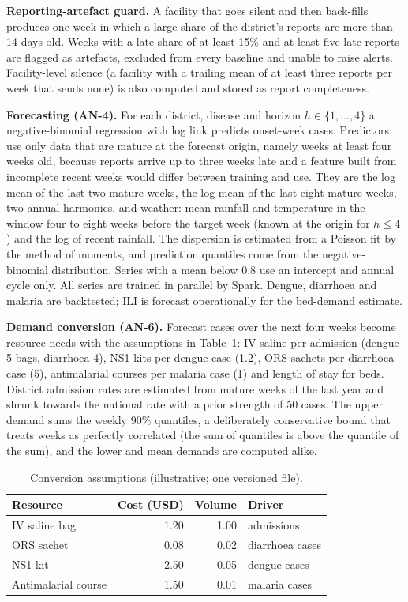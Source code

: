 \documentclass[conference]{IEEEtran}
\begin{document}
\textbf{Reporting-artefact guard.} A facility that goes silent and then back-fills produces one week in which a large share of the district's reports are more than 14 days old. Weeks with a late share of at least 15\% and at least five late reports are flagged as artefacts, excluded from every baseline and unable to raise alerts. Facility-level silence (a facility with a trailing mean of at least three reports per week that sends none) is also computed and stored as report completeness.

\textbf{Forecasting (AN-4).} For each district, disease and horizon $h\in\{1,\dots,4\}$ a negative-binomial regression with log link predicts onset-week cases. Predictors use only data that are mature at the forecast origin, namely weeks at least four weeks old, because reports arrive up to three weeks late and a feature built from incomplete recent weeks would differ between training and use. They are the log mean of the last two mature weeks, the log mean of the last eight mature weeks, two annual harmonics, and weather: mean rainfall and temperature in the window four to eight weeks before the target week (known at the origin for $h\le4$) and the log of recent rainfall. The dispersion is estimated from a Poisson fit by the method of moments, and prediction quantiles come from the negative-binomial distribution. Series with a mean below 0.8 use an intercept and annual cycle only. All series are trained in parallel by Spark. Dengue, diarrhoea and malaria are backtested; ILI is forecast operationally for the bed-demand estimate.

\textbf{Demand conversion (AN-6).} Forecast cases over the next four weeks become resource needs with the assumptions in Table~\ref{tab:assume}: IV saline per admission (dengue 5 bags, diarrhoea 4), NS1 kits per dengue case (1.2), ORS sachets per diarrhoea case (5), antimalarial courses per malaria case (1) and length of stay for beds. District admission rates are estimated from mature weeks of the last year and shrunk towards the national rate with a prior strength of 50 cases. The upper demand sums the weekly 90\% quantiles, a deliberately conservative bound that treats weeks as perfectly correlated (the sum of quantiles is above the quantile of the sum), and the lower and mean demands are computed alike.
\begin{table}[t]\caption{Conversion assumptions (illustrative; one versioned file).}\label{tab:assume}\centering\small
\begin{tabular}{@{}lrrl@{}}\toprule Resource & Cost (USD) & Volume & Driver \\\midrule
IV saline bag & 1.20 & 1.00 & admissions \\ ORS sachet & 0.08 & 0.02 & diarrhoea cases \\
NS1 kit & 2.50 & 0.05 & dengue cases \\ Antimalarial course & 1.50 & 0.01 & malaria cases \\\bottomrule\end{tabular}\end{table}
\end{document}

